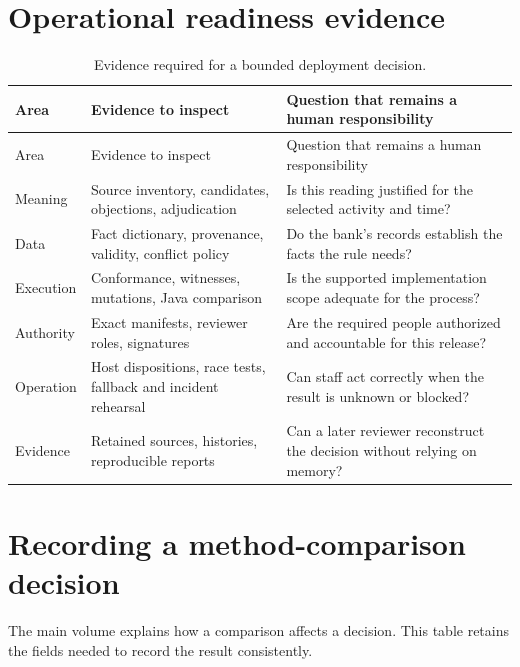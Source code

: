 \documentclass[12pt,a4paper,oneside,openany]{book}
\begin{document}
\section{Operational readiness evidence}
\begin{longtable}{@{}P{31mm}P{60mm}P{57mm}@{}}
\caption{Evidence required for a bounded deployment decision.}\\
\toprule
Area & Evidence to inspect & Question that remains a human responsibility\\\midrule\endfirsthead
\toprule Area & Evidence to inspect & Question that remains a human responsibility\\\midrule\endhead
Meaning & Source inventory, candidates, objections, adjudication & Is this reading justified for the selected activity and time?\\
Data & Fact dictionary, provenance, validity, conflict policy & Do the bank's records establish the facts the rule needs?\\
Execution & Conformance, witnesses, mutations, Java comparison & Is the supported implementation scope adequate for the process?\\
Authority & Exact manifests, reviewer roles, signatures & Are the required people authorized and accountable for this release?\\
Operation & Host dispositions, race tests, fallback and incident rehearsal & Can staff act correctly when the result is unknown or blocked?\\
Evidence & Retained sources, histories, reproducible reports & Can a later reviewer reconstruct the decision without relying on memory?\\
\bottomrule
\end{longtable}

\section{Recording a method-comparison decision}
\label{sec:comparison-decision-record}

The main volume explains how a comparison affects a decision. This table retains
the fields needed to record the result consistently.
\end{document}
